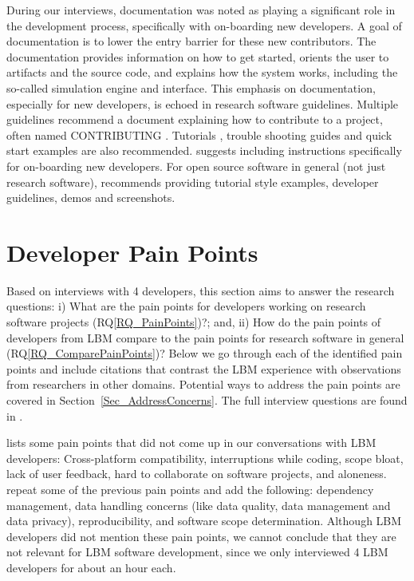 \documentclass[final, 3p, times, authoryear]{elsarticle}
\newcommand{\rqref}[1]{RQ\ref{#1}}
\begin{document}
During our interviews, documentation was noted as playing a significant role in
the development process, specifically with on-boarding new developers. A goal of
documentation is to lower the entry barrier for these new contributors. The
documentation provides information on how to get started, orients the user to
artifacts and the source code, and explains how the system works, including the
so-called simulation engine and interface.  This emphasis on documentation,
especially for new developers, is echoed in research software guidelines.
Multiple guidelines recommend a document explaining how to contribute to a
project, often named CONTRIBUTING \citep{Yo2021, BrettEtAl2021, WilsonEtAl2016,
ThielEtAl2020, vanGompelEtAl2016, OrvizEtAl2017, FLOSS2022, JimenezEtAl2017}.
Tutorials \citep{ThielEtAl2020}, trouble shooting guides \citep{OrvizEtAl2017,
SSI2022} and quick start examples \citep{ThielEtAl2020, vanGompelEtAl2016} are
also recommended.  \citep{SmithAndRoscoe2018} suggests including instructions
specifically for on-boarding new developers. For open source software in general
(not just research software), \citep{Fogel2005} recommends providing tutorial
style examples, developer guidelines, demos and screenshots.

\section{Developer Pain Points} \label{painpoints}

Based on interviews with 4 developers, this section aims to answer the research
questions: i) What are the pain points for developers working on research
software projects (\rqref{RQ_PainPoints})?; and, ii) How do the pain points of
developers from LBM compare to the pain points for research software in general
(\rqref{RQ_ComparePainPoints})?  Below we go through each of the identified pain
points and include citations that contrast the LBM experience with observations
from researchers in other domains.  Potential ways to address the pain points
are covered in Section~\ref{Sec_AddressConcerns}. The full interview questions
are found in \citet{SmithEtAl2021}.

\citep{PintoEtAl2018} lists some pain points that did not come up in our
conversations with LBM developers: Cross-platform compatibility, interruptions
while coding, scope bloat, lack of user feedback, hard to collaborate on
software projects, and aloneness. \citep{WieseEtAl2019} repeat some of the
previous pain points and add the following: dependency management, data handling
concerns (like data quality, data management and data privacy), reproducibility,
and software scope determination. Although LBM developers did not mention these
pain points, we cannot conclude that they are not relevant for LBM software
development, since we only interviewed 4 LBM developers for about an hour each.
\end{document}
